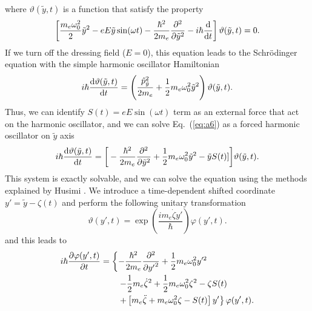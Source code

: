 \documentclass[
 reprint,
 amsmath,amssymb,
 aps,
 prb,
]{revtex4-2}
\begin{document}
where $\vartheta(\tilde{y},t)$ is a function that satisfy the property
\begin{equation} \label{eq:a6}
    \left[
    \frac{m_e \omega_0^2}{2} \tilde{y}^2
    - {eE\tilde{y}}\sin(\omega t)
    - \frac{\hbar^2}{2m_e} \pdv[2]{\tilde{y}}
    - i \hbar \dv{t}
    \right]
    \vartheta(\tilde{y},t) = 0.
\end{equation}
If we turn off the dressing field ($E=0$), this equation leads to the Schrödinger equation with the simple harmonic oscillator Hamiltonian
\begin{equation} \label{eq:a7}
     i \hbar \dv{\vartheta(\tilde{y},t)}{t} =
    \left(
    \frac{\hat{p}_{\tilde{y}}^2}{2m_e} +
    \frac{1}{2}m_e \omega_0^2\tilde{y}^2
    \right)
    \vartheta(\tilde{y},t).
\end{equation}
Thus, we can identify $S(t) = eE\sin(\omega t)$ term as an external force that act on the harmonic oscillator, and we can solve Eq.~(\ref{eq:a6}) as a forced harmonic oscillator on $\tilde{y}$ axis
\begin{equation} \label{eq:a8}
  \begin{aligned}
    i \hbar \dv{\vartheta(\tilde{y},t)}{t} =
    \bigg[
    -
    \frac{\hbar^2}{2m_e}
    \pdv[2]{\tilde{y}} +
    \frac{1}{2}m_e \omega_0^2\tilde{y}^2
    - \tilde{y}S(t)]
    \bigg]
    \vartheta(\tilde{y},t).
  \end{aligned}
\end{equation}
This system is exactly solvable, and we can solve the equation using the methods explained by Husimi \cite{husimi53}. We introduce a time-dependent shifted coordinate $ y' = \tilde{y} - \zeta(t)$ and perform the following unitary transformation
\begin{equation} \label{eq:a9}
    \vartheta(y',t) = \exp(\frac{im_e\dot{\zeta}y'}{\hbar})\varphi(y',t).
\end{equation}
and this leads to
\begin{equation} \label{eq:a10}
  \begin{aligned}
    i \hbar \pdv{\varphi(y',t)}{t}   &=
    \left\{
        -  \frac{\hbar^2}{2m_e}\pdv[2]{{y'}}
        + \frac{1}{2} m_e \omega_0^2 y'^2
        \right. \\
        & \left. \qquad
        - \frac{1}{2} m_e\dot{\zeta}^2 + \frac{1}{2}m_e\omega_0^2 \zeta^2 - \zeta S(t)
        \right. \\
        & \left. \qquad +
        \left[
            m_e\ddot{\zeta} + m_e\omega_0^2\zeta - S(t)
        \right]y'
    \right\} \varphi(y',t).
  \end{aligned}
\end{equation}
\end{document}
